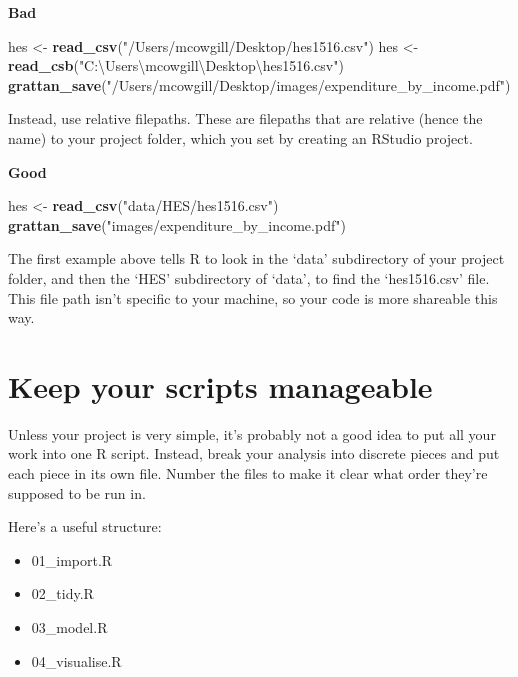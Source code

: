 \documentclass[]{book}
\newenvironment{Shaded}{\begin{snugshade}}{\end{snugshade}}
\newcommand{\KeywordTok}[1]{\textcolor[rgb]{0.13,0.29,0.53}{\textbf{#1}}}
\newcommand{\NormalTok}[1]{#1}
\newcommand{\StringTok}[1]{\textcolor[rgb]{0.31,0.60,0.02}{#1}}
\providecommand{\tightlist}{%
  \setlength{\itemsep}{0pt}\setlength{\parskip}{0pt}}
\begin{document}
\textbf{Bad}

\begin{Shaded}
\begin{Highlighting}[]
\NormalTok{hes <-}\StringTok{ }\KeywordTok{read_csv}\NormalTok{(}\StringTok{"/Users/mcowgill/Desktop/hes1516.csv"}\NormalTok{)}
\NormalTok{hes <-}\StringTok{ }\KeywordTok{read_csb}\NormalTok{(}\StringTok{"C:\textbackslash{}Users\textbackslash{}mcowgill\textbackslash{}Desktop\textbackslash{}hes1516.csv"}\NormalTok{)}
\KeywordTok{grattan_save}\NormalTok{(}\StringTok{"/Users/mcowgill/Desktop/images/expenditure_by_income.pdf"}\NormalTok{)}
\end{Highlighting}
\end{Shaded}

Instead, use relative filepaths. These are filepaths that are relative (hence the name) to your project folder, which you set by creating an RStudio project.

\textbf{Good}

\begin{Shaded}
\begin{Highlighting}[]
\NormalTok{hes <-}\StringTok{ }\KeywordTok{read_csv}\NormalTok{(}\StringTok{"data/HES/hes1516.csv"}\NormalTok{)}
\KeywordTok{grattan_save}\NormalTok{(}\StringTok{"images/expenditure_by_income.pdf"}\NormalTok{)}
\end{Highlighting}
\end{Shaded}

The first example above tells R to look in the `data' subdirectory of your project folder, and then the `HES' subdirectory of `data', to find the `hes1516.csv' file. This file path isn't specific to your machine, so your code is more shareable this way.

\hypertarget{keep-your-scripts-manageable}{%
\section{Keep your scripts manageable}\label{keep-your-scripts-manageable}}

Unless your project is very simple, it's probably not a good idea to put all your work into one R script. Instead, break your analysis into discrete pieces and put each piece in its own file. Number the files to make it clear what order they're supposed to be run in.

Here's a useful structure:

\begin{itemize}
\tightlist
\item
  01\_import.R
\item
  02\_tidy.R
\item
  03\_model.R
\item
  04\_visualise.R
\end{itemize}
\end{document}
